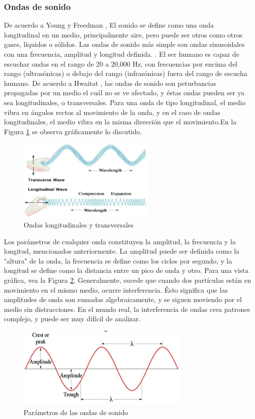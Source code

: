 \documentclass[12pt, letterpaper]{article}
\begin{document}
\subsubsection{Ondas de sonido}
De acuerdo a Young y Freedman \cite{university-physics}, El sonido se define como una onda 
longitudinal en un medio, principalmente aire, pero puede ser otros como otros gases, líquidos o sólidos. Las 
ondas de sonido más simple son ondas sinusoidales con una frecuencia, amplitud y longitud definida. 
\cite{university-physics}. El ser humano es capaz de escuchar ondas en el rango de 20 a 20,000 Hz, con 
frecuencias por encima del rango (ultrasónicas) o debajo del rango (infrasónicas) fuera del rango de escucha humano. 
De acuerdo a Hwaitat \cite{frequencies-wave-sound-pso}, las ondas de sonido son peturbancias propagadas por un medio el cuál 
no se ve afectado, y éstas ondas pueden ser ya sea longitudinales, o transversales. Para una onda 
de tipo longitudinal, el medio vibra en ángulos rectos al movimiento de la onda, y en el caso de ondas longitudinales, 
el medio vibra en la misma dirección que el movimiento.En la Figura \ref*{Ondas Longitudinales} se observa gráficamente lo discutido. 
\begin{figure}[H]
  \centering
  \includegraphics[height = 4cm]{imgs/investigacion/ondas_longitudinales_transversales.png}
  \caption{Ondas longitudinales y transversales}
  \label{Ondas Longitudinales}
\end{figure}
Los parámetros de cualquier onda constituyen la amplitud, la frecuencia 
y la longitud, mencionados anteriormente. La amplitud puede ser definida como la "altura" 
de la onda, la frecuencia se define como los ciclos por segundo, y la longitud se define como la distancia 
entre un pico de onda y otro. Para una vista gráfica, vea la Figura \ref*{parametros-ondas}. Generalmente, sucede que 
cuando dos partículas están en movimiento en el mismo medio, ocurre interferencia. Ésto significa que 
las amplitudes de onda son sumadas algebraicamente, y se siguen moviendo por el medio sin distracciones. En el mundo real, 
la interferencia de ondas crea patrones complejo, y puede ser muy difícil de analizar.  
\begin{figure}[H]
  \centering
  \includegraphics[height = 4cm]{imgs/investigacion/parametros-ondas.png}
  \caption{Parámetros de las ondas de sonido}
  \label{parametros-ondas}
\end{figure}
\end{document}
